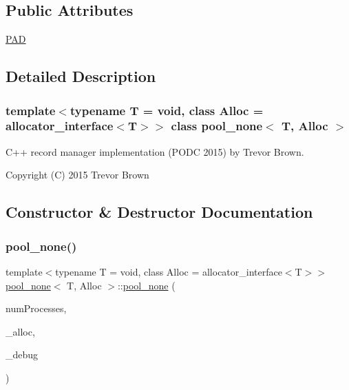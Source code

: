 \subsection*{Public Attributes}
\begin{DoxyCompactItemize}
\item 
\hyperlink{classpool__none_a071df42d9f83a773764e034b0cbdaf9f}{P\+AD}
\end{DoxyCompactItemize}


\subsection{Detailed Description}
\subsubsection*{template$<$typename T = void, class Alloc = allocator\+\_\+interface$<$\+T$>$$>$\newline
class pool\+\_\+none$<$ T, Alloc $>$}

C++ record manager implementation (P\+O\+DC 2015) by Trevor Brown.

Copyright (C) 2015 Trevor Brown 

\subsection{Constructor \& Destructor Documentation}
\mbox{\label{classpool__none_ab79b85eedba6f8cbf97f226cafa87e7a}} 
\subsubsection{\texorpdfstring{pool\+\_\+none()}{pool\_none()}}
{\footnotesize\ttfamily template$<$typename T  = void, class Alloc  = allocator\+\_\+interface$<$\+T$>$$>$ \\
\hyperlink{classpool__none}{pool\+\_\+none}$<$ T, Alloc $>$\+::\hyperlink{classpool__none}{pool\+\_\+none} (\begin{DoxyParamCaption}\item[{const int}]{num\+Processes,  }\item[{Alloc $\ast$const}]{\+\_\+alloc,  }\item[{\hyperlink{classdebugInfo}{debug\+Info} $\ast$const}]{\+\_\+debug }\end{DoxyParamCaption})\hspace{0.3cm}{\ttfamily [inline]}}

